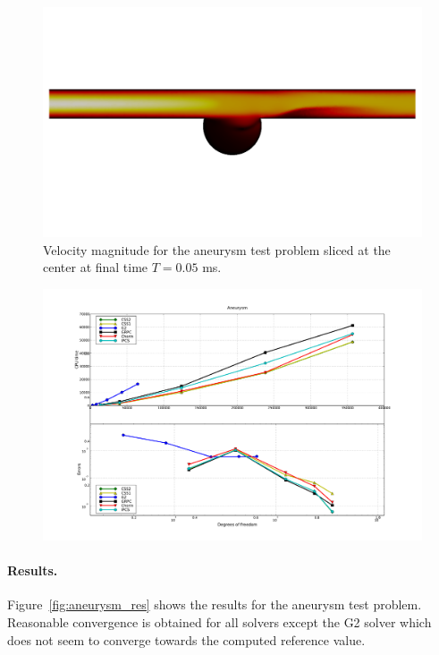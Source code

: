 \begin{figure}
\bwfig
  \includegraphics[width=\largefig]{chapters/kvs-1/pdf/aneurysm_at_end_css1.pdf}
  \caption{Velocity magnitude for the aneurysm test problem sliced at
  the center at final time $T = 0.05$ ms.}
  \label{fig:aneurysm}
\end{figure}

\begin{figure}
  {\includegraphics[width=\fullfig]{chapters/kvs-1/pdf/new_aneurysm_res.pdf}}
\end{figure}

\paragraph{Results.}

Figure~\ref{fig:aneurysm_res} shows the results for the aneurysm test
problem. Reasonable convergence is obtained for all solvers except the
G2 solver which does not seem to converge towards the computed
reference value.

